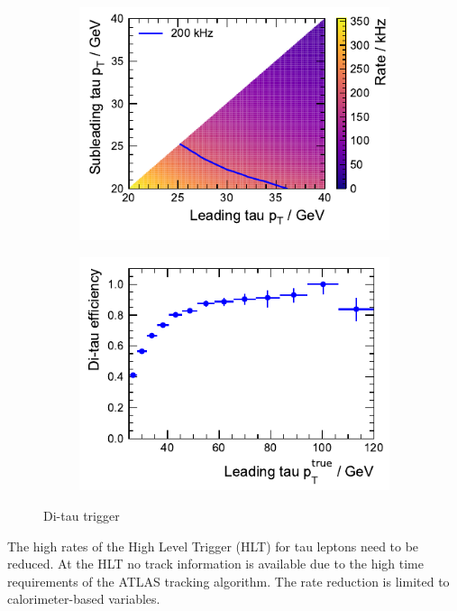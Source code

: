 \begin{figure}[htb]
  \centering
  \begin{subfigure}[t]{0.48\textwidth}
    \centering
    \includegraphics{./figures/rnn/trigger/pt_rate_reg.pdf}
  \end{subfigure}\hfill
  \begin{subfigure}[t]{0.48\textwidth}
    \centering
    \includegraphics{./figures/rnn/trigger/taueff_reg.pdf}
  \end{subfigure}
  \caption{Di-tau trigger}
  \label{fig:rnn_ditau_trigger}
\end{figure}

The high rates of the High Level Trigger (HLT) for tau leptons need to be
reduced. At the HLT no track information is available due to the high time
requirements of the ATLAS tracking algorithm. The rate reduction is limited to
calorimeter-based variables.

